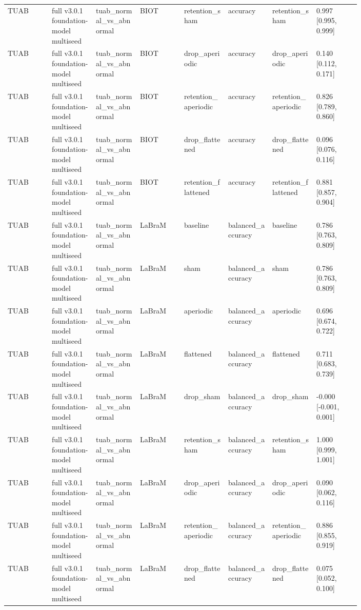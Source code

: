 \begin{longtable}{p{0.10\linewidth}p{0.10\linewidth}p{0.10\linewidth}p{0.10\linewidth}p{0.10\linewidth}p{0.10\linewidth}p{0.10\linewidth}p{0.10\linewidth}}
TUAB & full v3.0.1 foundation-model multiseed & tuab\_normal\_vs\_abnormal & BIOT & retention\_sham & accuracy & retention\_sham & 0.997 [0.995, 0.999]\\
TUAB & full v3.0.1 foundation-model multiseed & tuab\_normal\_vs\_abnormal & BIOT & drop\_aperiodic & accuracy & drop\_aperiodic & 0.140 [0.112, 0.171]\\
TUAB & full v3.0.1 foundation-model multiseed & tuab\_normal\_vs\_abnormal & BIOT & retention\_aperiodic & accuracy & retention\_aperiodic & 0.826 [0.789, 0.860]\\
TUAB & full v3.0.1 foundation-model multiseed & tuab\_normal\_vs\_abnormal & BIOT & drop\_flattened & accuracy & drop\_flattened & 0.096 [0.076, 0.116]\\
TUAB & full v3.0.1 foundation-model multiseed & tuab\_normal\_vs\_abnormal & BIOT & retention\_flattened & accuracy & retention\_flattened & 0.881 [0.857, 0.904]\\
TUAB & full v3.0.1 foundation-model multiseed & tuab\_normal\_vs\_abnormal & LaBraM & baseline & balanced\_accuracy & baseline & 0.786 [0.763, 0.809]\\
TUAB & full v3.0.1 foundation-model multiseed & tuab\_normal\_vs\_abnormal & LaBraM & sham & balanced\_accuracy & sham & 0.786 [0.763, 0.809]\\
TUAB & full v3.0.1 foundation-model multiseed & tuab\_normal\_vs\_abnormal & LaBraM & aperiodic & balanced\_accuracy & aperiodic & 0.696 [0.674, 0.722]\\
TUAB & full v3.0.1 foundation-model multiseed & tuab\_normal\_vs\_abnormal & LaBraM & flattened & balanced\_accuracy & flattened & 0.711 [0.683, 0.739]\\
TUAB & full v3.0.1 foundation-model multiseed & tuab\_normal\_vs\_abnormal & LaBraM & drop\_sham & balanced\_accuracy & drop\_sham & -0.000 [-0.001, 0.001]\\
TUAB & full v3.0.1 foundation-model multiseed & tuab\_normal\_vs\_abnormal & LaBraM & retention\_sham & balanced\_accuracy & retention\_sham & 1.000 [0.999, 1.001]\\
TUAB & full v3.0.1 foundation-model multiseed & tuab\_normal\_vs\_abnormal & LaBraM & drop\_aperiodic & balanced\_accuracy & drop\_aperiodic & 0.090 [0.062, 0.116]\\
TUAB & full v3.0.1 foundation-model multiseed & tuab\_normal\_vs\_abnormal & LaBraM & retention\_aperiodic & balanced\_accuracy & retention\_aperiodic & 0.886 [0.855, 0.919]\\
TUAB & full v3.0.1 foundation-model multiseed & tuab\_normal\_vs\_abnormal & LaBraM & drop\_flattened & balanced\_accuracy & drop\_flattened & 0.075 [0.052, 0.100]\\

\end{longtable}
